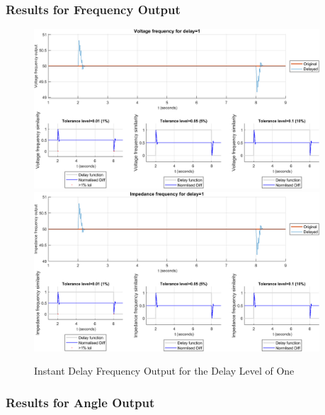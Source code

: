 \newpage \subsubsection{Results for Frequency Output}
\begin{figure}
    \caption{Instant Delay Frequency Output for the Delay Level of One}
    \includegraphics[width=0.95\textwidth]{PMUsim-figures/DelayOf_1/Instant_vFrequency.png}    
  \includegraphics[width=0.95\textwidth]{PMUsim-figures/DelayOf_1/Instant_iFrequency.png}    
    \label{fig:PMUsim_One_Frequency}
\end{figure}
\newpage \subsubsection{Results for Angle Output}

